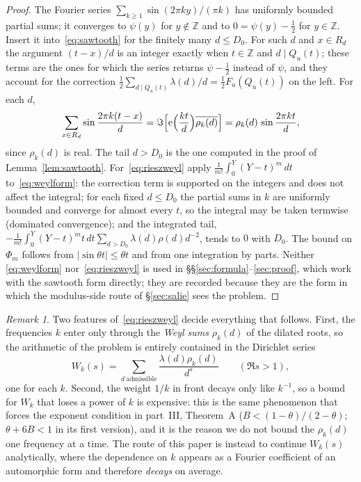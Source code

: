 \documentclass[11pt,a4paper]{article}
\theoremstyle{remark}\newtheorem{remark}[theorem]{Remark}
\newcommand{\Z}{\mathbb Z}\newcommand{\R}{\mathbb R}\newcommand{\Q}{\mathbb Q}\newcommand{\C}{\mathbb C}
\newcommand{\e}{\mathrm e}\newcommand{\Off}{\mathrm{Off}}\newcommand{\rep}[2]{\langle #1\rangle_{#2}}
\begin{document}
\begin{proof}
The Fourier series $\sum_{k\ge1}\sin(2\pi ky)/(\pi k)$ has uniformly bounded partial sums; it converges to $\psi(y)$
for $y\notin\Z$ and to $0=\psi(y)-\tfrac12$ for $y\in\Z$. Insert it into~\eqref{eq:sawtooth} for the finitely many
$d\le D_0$. For such $d$ and $x\in R_d$ the argument $(t-x)/d$ is an integer exactly when $t\in\Z$ and
$d\mid Q_u(t)$; these terms are the ones for which the series returns $\psi-\tfrac12$ instead of $\psi$, and they
account for the correction $\tfrac12\sum_{d\mid Q_u(t)}\lambda(d)/d=\tfrac12F_u(Q_u(t))$ on the left. For each $d$,
\[
\sum_{x\in R_d}\sin\frac{2\pi k(t-x)}d=\Im\Bigl[\e\Bigl(\frac{kt}d\Bigr)\overline{\rho_k(d)}\Bigr]=\rho_k(d)\,\sin\frac{2\pi kt}d,
\]
since $\rho_k(d)$ is real. The tail $d>D_0$ is the one computed in the proof of Lemma~\ref{lem:sawtooth}.
For~\eqref{eq:rieszweyl} apply $\frac1{m!}\int_0^Y(Y-t)^m\,dt$ to~\eqref{eq:weylform}: the correction term is
supported on the integers and does not affect the integral; for each fixed $d\le D_0$ the partial sums in $k$ are
uniformly bounded and converge for almost every $t$, so the integral may be taken termwise (dominated convergence);
and the integrated tail, $-\frac1{m!}\int_0^Y(Y-t)^mt\,dt\sum_{d>D_0}\lambda(d)\rho(d)d^{-2}$, tends to $0$ with
$D_0$. The bound on $\Phi_m$ follows from $|\sin\theta t|\le\theta t$ and from one integration by parts. Neither
\eqref{eq:weylform} nor~\eqref{eq:rieszweyl} is used in \S\S\ref{sec:formula}--\ref{sec:proof}, which work with the
sawtooth form directly; they are recorded because they are the form in which the modulus-side route of
\S\ref{sec:salie} sees the problem.
\end{proof}

\begin{remark}\label{rem:whyk}
Two features of~\eqref{eq:rieszweyl} decide everything that follows. First, the frequencies $k$ enter only through the
\emph{Weyl sums} $\rho_k(d)$ of the dilated roots, so the arithmetic of the problem is entirely contained in the
Dirichlet series
\begin{equation}\label{eq:Wk}
W_k(s)=\sum_{d\ \mathrm{admissible}}\frac{\lambda(d)\rho_k(d)}{d^{s}}\qquad(\Re s>1),
\end{equation}
one for each $k$. Second, the weight $1/k$ in front decays only like $k^{-1}$, so a bound for $W_k$ that loses a power
of $k$ is expensive: this is the same phenomenon that forces the exponent condition in part~III,
Theorem~A ($B<(1-\theta)/(2-\theta)$; $\theta+6B<1$ in its first version), and it is the reason we do not bound the $\rho_k(d)$ one frequency at a time. The route of this paper is
instead to continue $W_k(s)$ analytically, where the dependence on $k$ appears as a Fourier coefficient of an
automorphic form and therefore \emph{decays} on average.
\end{remark}
\end{document}
